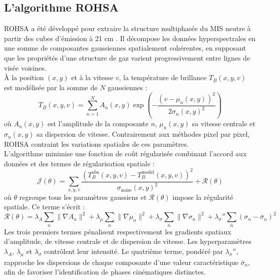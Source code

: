 \subsection{L'algorithme ROHSA}
\label{subsec:rohsa_algorithm}

ROHSA a été développé pour extraire la structure multiphasée du MIS neutre à partir des cubes d'émission à 21 cm \citep{Marchal2019}. Il décompose les données hyperspectrales en une somme de composantes gaussiennes spatialement cohérentes, en supposant que les propriétés d'une structure de gaz varient progressivement entre lignes de visée voisines.\\\indent
À la position $(x,y)$ et à la vitesse $v$, la température de brillance $T_B(x,y,v)$ est modélisée par la somme de $N$ gaussiennes :
\begin{equation}
	T_B(x, y, v) = \sum_{n=1}^{N} A_n(x, y) \exp\left(-\frac{(v - \mu_n(x, y))^2}{2\sigma_n(x, y)^2}\right)
	\label{eq:gaussian_model}
\end{equation}
\noindent où $A_n(x,y)$ est l'amplitude de la composante $n$, $\mu_n(x,y)$ sa vitesse centrale et $\sigma_n(x,y)$ sa dispersion de vitesse. Contrairement aux méthodes pixel par pixel, ROHSA contraint les variations spatiales de ces paramètres.\\\indent
L'algorithme minimise une fonction de coût régularisée combinant l'accord aux données et des termes de régularisation spatiale :
\begin{equation}
	\mathcal{J}(\theta) = \sum_{x,y,v} \frac{(T_B^{\mathrm{obs}}(x,y,v) - T_B^{\mathrm{model}}(x,y,v))^2}{\sigma_{\mathrm{noise}}(x,y)^2} + \mathcal{R}(\theta)
	\label{eq:cost_function}
\end{equation}
\noindent où $\theta$ regroupe tous les paramètres gaussiens et $\mathcal{R}(\theta)$ impose la régularité spatiale. Ce terme s'écrit :
\begin{equation}
	\mathcal{R}(\theta) = \lambda_A \sum_n \|\nabla A_n\|^2 + \lambda_\mu \sum_n \|\nabla \mu_n\|^2 + \lambda_\sigma \sum_n \|\nabla \sigma_n\|^2 + \lambda_\sigma'' \sum_n (\sigma_n - \bar{\sigma}_n)^2
	\label{eq:regularisation}
\end{equation}
\noindent Les trois premiers termes pénalisent respectivement les gradients spatiaux d'amplitude, de vitesse centrale et de dispersion de vitesse. Les hyperparamètres $\lambda_A$, $\lambda_\mu$ et $\lambda_\sigma$ contrôlent leur intensité. Le quatrième terme, pondéré par $\lambda_\sigma''$, rapproche les dispersions de chaque composante d'une valeur caractéristique $\bar{\sigma}_n$, afin de favoriser l'identification de phases cinématiques distinctes.\\\indent
